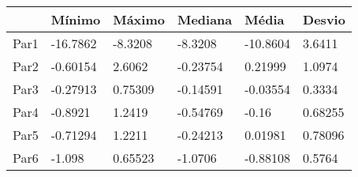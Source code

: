 \begin{tabular}{llllll}
& Mínimo & Máximo & Mediana & Média & Desvio \\ 
\hline 
Par1 & -16.7862 & -8.3208 & -8.3208 & -10.8604 & 3.6411 \\ 
Par2 & -0.60154 & 2.6062 & -0.23754 & 0.21999 & 1.0974 \\ 
Par3 & -0.27913 & 0.75309 & -0.14591 & -0.03554 & 0.3334 \\ 
Par4 & -0.8921 & 1.2419 & -0.54769 & -0.16 & 0.68255 \\ 
Par5 & -0.71294 & 1.2211 & -0.24213 & 0.01981 & 0.78096 \\ 
Par6 & -1.098 & 0.65523 & -1.0706 & -0.88108 & 0.5764 \\ 
\hline 
\end{tabular}